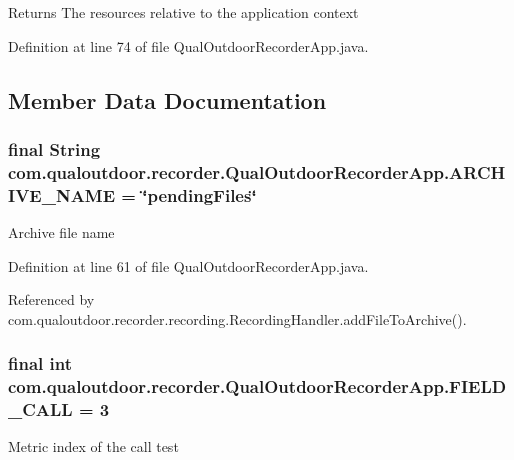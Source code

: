 \begin{DoxyReturn}{Returns}
The resources relative to the application context 
\end{DoxyReturn}


Definition at line 74 of file Qual\-Outdoor\-Recorder\-App.\-java.



\subsection{Member Data Documentation}
\hypertarget{classcom_1_1qualoutdoor_1_1recorder_1_1QualOutdoorRecorderApp_afbca072ac6fb09da0983bad3b41c9f55}{
\subsubsection[{A\-R\-C\-H\-I\-V\-E\-\_\-\-N\-A\-M\-E}]{\setlength{\rightskip}{0pt plus 5cm}final String com.\-qualoutdoor.\-recorder.\-Qual\-Outdoor\-Recorder\-App.\-A\-R\-C\-H\-I\-V\-E\-\_\-\-N\-A\-M\-E = \char`\"{}pending\-Files\char`\"{}\hspace{0.3cm}{\ttfamily [static]}}}\label{classcom_1_1qualoutdoor_1_1recorder_1_1QualOutdoorRecorderApp_afbca072ac6fb09da0983bad3b41c9f55}
Archive file name 

Definition at line 61 of file Qual\-Outdoor\-Recorder\-App.\-java.



Referenced by com.\-qualoutdoor.\-recorder.\-recording.\-Recording\-Handler.\-add\-File\-To\-Archive().

\hypertarget{classcom_1_1qualoutdoor_1_1recorder_1_1QualOutdoorRecorderApp_a56647485a7e66a2d1c80785e29ae89e7}{
\subsubsection[{F\-I\-E\-L\-D\-\_\-\-C\-A\-L\-L}]{\setlength{\rightskip}{0pt plus 5cm}final int com.\-qualoutdoor.\-recorder.\-Qual\-Outdoor\-Recorder\-App.\-F\-I\-E\-L\-D\-\_\-\-C\-A\-L\-L = 3\hspace{0.3cm}{\ttfamily [static]}}}\label{classcom_1_1qualoutdoor_1_1recorder_1_1QualOutdoorRecorderApp_a56647485a7e66a2d1c80785e29ae89e7}
Metric index of the call test 

